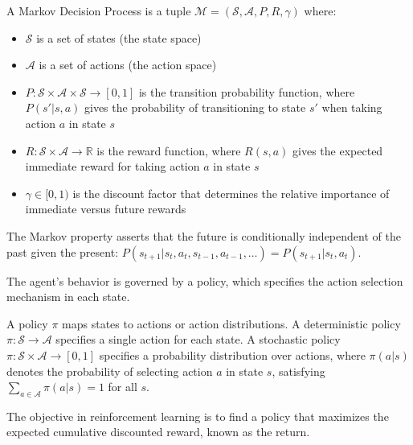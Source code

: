 \begin{definition}
\label{def:mdp}
A Markov Decision Process is a tuple $\mathcal{M} = (\mathcal{S}, \mathcal{A}, P, R, \gamma)$ where:
\begin{itemize}
\item $\mathcal{S}$ is a set of states (the state space)
\item $\mathcal{A}$ is a set of actions (the action space)
\item $P: \mathcal{S} \times \mathcal{A} \times \mathcal{S} \rightarrow [0,1]$ is the transition probability function, where $P(s'|s,a)$ gives the probability of transitioning to state $s'$ when taking action $a$ in state $s$
\item $R: \mathcal{S} \times \mathcal{A} \rightarrow \mathbb{R}$ is the reward function, where $R(s,a)$ gives the expected immediate reward for taking action $a$ in state $s$
\item $\gamma \in [0,1)$ is the discount factor that determines the relative importance of immediate versus future rewards
\end{itemize}
The Markov property asserts that the future is conditionally independent of the past given the present: $P(s_{t+1}|s_t, a_t, s_{t-1}, a_{t-1}, \ldots) = P(s_{t+1}|s_t, a_t)$.
\end{definition}

The agent's behavior is governed by a policy, which specifies the action selection mechanism in each state.

\begin{definition}[Policy]
\label{def:policy}
A policy $\pi$ maps states to actions or action distributions. A deterministic policy $\pi: \mathcal{S} \rightarrow \mathcal{A}$ specifies a single action for each state. A stochastic policy $\pi: \mathcal{S} \times \mathcal{A} \rightarrow [0,1]$ specifies a probability distribution over actions, where $\pi(a|s)$ denotes the probability of selecting action $a$ in state $s$, satisfying $\sum_{a \in \mathcal{A}} \pi(a|s) = 1$ for all $s$.
\end{definition}

The objective in reinforcement learning is to find a policy that maximizes the expected cumulative discounted reward, known as the return.

